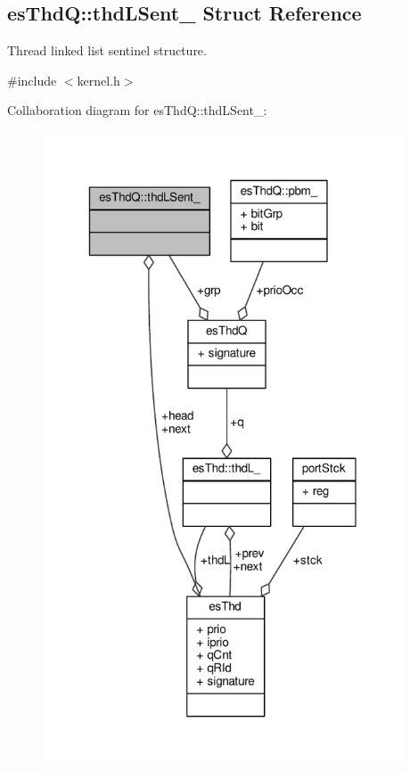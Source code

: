 \hypertarget{structesThdQ_1_1thdLSent__}{\subsection{es\-Thd\-Q\-:\-:thd\-L\-Sent\-\_\- Struct Reference}
\label{structesThdQ_1_1thdLSent__}
}


Thread linked list sentinel structure.  




{\ttfamily \#include $<$kernel.\-h$>$}



Collaboration diagram for es\-Thd\-Q\-:\-:thd\-L\-Sent\-\_\-\-:\nopagebreak
\begin{figure}[H]
\begin{center}
\leavevmode
\includegraphics[width=303pt]{structesThdQ_1_1thdLSent____coll__graph}
\end{center}
\end{figure}
